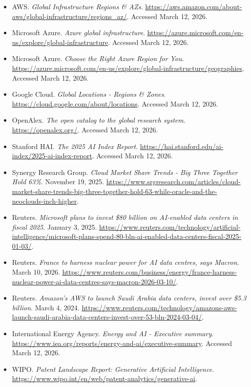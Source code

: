 \documentclass[11pt]{article}
\begin{document}
\begin{itemize}[leftmargin=*]
  \item AWS. \emph{Global Infrastructure Regions \& AZs}. \url{https://aws.amazon.com/about-aws/global-infrastructure/regions_az/}. Accessed March 12, 2026.
  \item Microsoft Azure. \emph{Azure global infrastructure}. \url{https://azure.microsoft.com/en-us/explore/global-infrastructure}. Accessed March 12, 2026.
  \item Microsoft Azure. \emph{Choose the Right Azure Region for You}. \url{https://azure.microsoft.com/en-us/explore/global-infrastructure/geographies}. Accessed March 12, 2026.
  \item Google Cloud. \emph{Global Locations - Regions \& Zones}. \url{https://cloud.google.com/about/locations}. Accessed March 12, 2026.
  \item OpenAlex. \emph{The open catalog to the global research system}. \url{https://openalex.org/}. Accessed March 12, 2026.
  \item Stanford HAI. \emph{The 2025 AI Index Report}. \url{https://hai.stanford.edu/ai-index/2025-ai-index-report}. Accessed March 12, 2026.
  \item Synergy Research Group. \emph{Cloud Market Share Trends - Big Three Together Hold 63\%}. November 19, 2025. \url{https://www.srgresearch.com/articles/cloud-market-share-trends-big-three-together-hold-63-while-oracle-and-the-neoclouds-inch-higher}.
  \item Reuters. \emph{Microsoft plans to invest \$80 billion on AI-enabled data centers in fiscal 2025}. January 3, 2025. \url{https://www.reuters.com/technology/artificial-intelligence/microsoft-plans-spend-80-bln-ai-enabled-data-centers-fiscal-2025-01-03/}.
  \item Reuters. \emph{France to harness nuclear power for AI data centres, says Macron}. March 10, 2026. \url{https://www.reuters.com/business/energy/france-harness-nuclear-power-ai-data-centres-says-macron-2026-03-10/}.
  \item Reuters. \emph{Amazon's AWS to launch Saudi Arabia data centers, invest over \$5.3 billion}. March 4, 2024. \url{https://www.reuters.com/technology/amazons-aws-launch-saudi-arabia-data-centers-invest-over-53-bln-2024-03-04/}.
  \item International Energy Agency. \emph{Energy and AI - Executive summary}. \url{https://www.iea.org/reports/energy-and-ai/executive-summary}. Accessed March 12, 2026.
  \item WIPO. \emph{Patent Landscape Report: Generative Artificial Intelligence}. \url{https://www.wipo.int/en/web/patent-analytics/generative-ai}.
\end{itemize}
\end{document}
